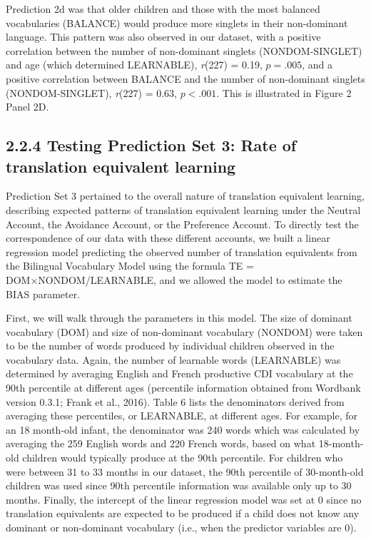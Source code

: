 \documentclass[
  english,
  ,man,floatsintext]{apa6}
\begin{document}
Prediction 2d was that older children and those with the most balanced vocabularies (BALANCE) would produce more singlets in their non-dominant language. This pattern was also observed in our dataset, with a positive correlation between the number of non-dominant singlets (NONDOM-SINGLET) and age (which determined LEARNABLE), \emph{r}(227) = 0.19, \(p = .005\), and a positive correlation between BALANCE and the number of non-dominant singlets (NONDOM-SINGLET), \emph{r}(227) = 0.63, \(p < .001\). This is illustrated in Figure 2 Panel 2D.

\hypertarget{testing-prediction-set-3-rate-of-translation-equivalent-learning}{%
\subsection{2.2.4 Testing Prediction Set 3: Rate of translation equivalent learning}\label{testing-prediction-set-3-rate-of-translation-equivalent-learning}}

Prediction Set 3 pertained to the overall nature of translation equivalent learning, describing expected patterns of translation equivalent learning under the Neutral Account, the Avoidance Account, or the Preference Account. To directly test the correspondence of our data with these different accounts, we built a linear regression model predicting the observed number of translation equivalents from the Bilingual Vocabulary Model using the formula TE = DOM×NONDOM/LEARNABLE, and we allowed the model to estimate the BIAS parameter.

First, we will walk through the parameters in this model. The size of dominant vocabulary (DOM) and size of non-dominant vocabulary (NONDOM) were taken to be the number of words produced by individual children observed in the vocabulary data. Again, the number of learnable words (LEARNABLE) was determined by averaging English and French productive CDI vocabulary at the 90th percentile at different ages (percentile information obtained from Wordbank version 0.3.1; Frank et al., 2016). Table 6 lists the denominators derived from averaging these percentiles, or LEARNABLE, at different ages. For example, for an 18 month-old infant, the denominator was 240 words which was calculated by averaging the 259 English words and 220 French words, based on what 18-month-old children would typically produce at the 90th percentile. For children who were between 31 to 33 months in our dataset, the 90th percentile of 30-month-old children was used since 90th percentile information was available only up to 30 months. Finally, the intercept of the linear regression model was set at 0 since no translation equivalents are expected to be produced if a child does not know any dominant or non-dominant vocabulary (i.e., when the predictor variables are 0).
\end{document}
